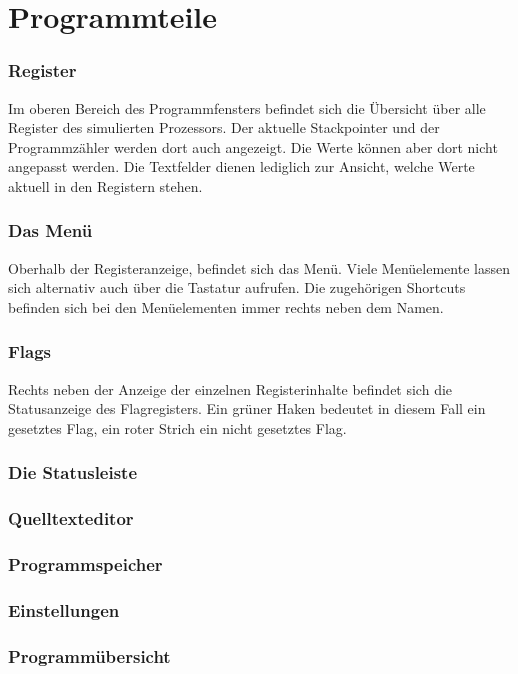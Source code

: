 \documentclass[11pt,a4paper]{hsfuldabook}
\begin{document}
\section{Programmteile}
\subsubsection{Register}
Im oberen Bereich des Programmfensters befindet sich die Übersicht über alle Register des simulierten
Prozessors. Der aktuelle Stackpointer und der Programmzähler werden dort auch angezeigt. Die Werte
können aber dort nicht angepasst werden. Die Textfelder dienen lediglich zur Ansicht, welche Werte
aktuell in den Registern stehen.

\subsubsection{Das Menü}
Oberhalb der Registeranzeige, befindet sich das Menü. Viele Menüelemente lassen sich alternativ auch
über die Tastatur aufrufen. Die zugehörigen Shortcuts befinden sich bei den Menüelementen immer rechts
neben dem Namen.

\subsubsection{Flags}
Rechts neben der Anzeige der einzelnen Registerinhalte befindet sich die Statusanzeige des
Flagregisters. Ein grüner Haken bedeutet in diesem Fall ein gesetztes Flag, ein roter Strich ein
nicht gesetztes Flag.

\subsubsection{Die Statusleiste}

\subsubsection{Quelltexteditor}

\subsubsection{Programmspeicher}

\subsubsection{Einstellungen}

\subsubsection{Programmübersicht}
\end{document}
